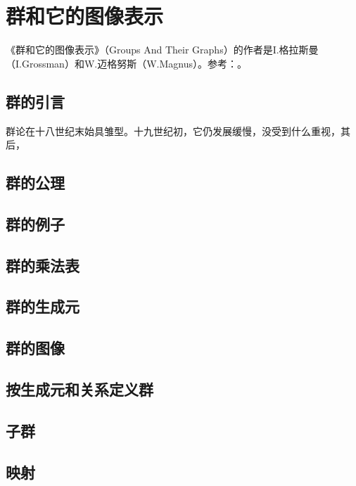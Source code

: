 \part{群和它的图像表示}
《群和它的图像表示》（Groups And Their Graphs）的作者是I.格拉斯曼（I.Grossman）和W.迈格努斯（W.Magnus）。参考：\cite{GroupsAndTheirGraphs1981}。

\chapter{群的引言}\label{section00401}
群论在十八世纪末始具雏型。十九世纪初，它仍发展缓慢，没受到什么重视，其后，


\chapter{群的公理}\label{section00402}


\chapter{群的例子}\label{section00403}


\chapter{群的乘法表}\label{section00404}


\chapter{群的生成元}\label{section00405}


\chapter{群的图像}\label{section00406}


\chapter{按生成元和关系定义群}\label{section00407}


\chapter{子群}\label{section00408}


\chapter{映射}\label{section00409}


